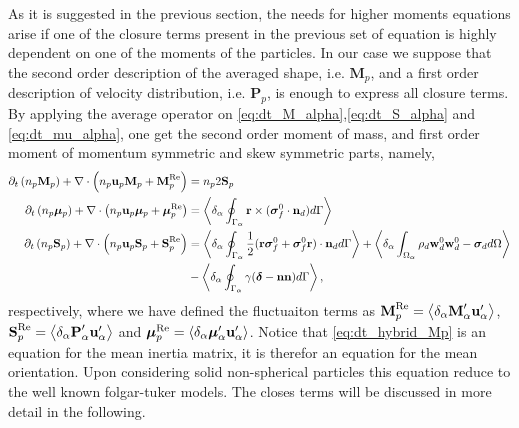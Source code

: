 As it is suggested in the previous section, the needs for higher moments equations arise if one of the closure terms present in the previous set of equation is highly dependent on one of the moments of the particles. 
In our case we suppose that the second order description of the averaged shape, i.e. $\textbf{M}_p$, and a first order description of velocity distribution, i.e. $\textbf{P}_p$,  is enough to express all closure terms. 
By applying the average operator on \ref{eq:dt_M_alpha},\ref{eq:dt_S_alpha} and \ref{eq:dt_mu_alpha}, one get the second order moment of mass, and first order moment of momentum symmetric and skew symmetric parts, namely, 
\begin{align}
    \partial_t \left(n_p \textbf{M}_p\right)
    + \mathbf{\nabla}\cdot \left(
        n_p \textbf{u}_p \textbf{M}_p
    + \textbf{M}_p^\text{Re}
    \right)
    &=
    n_p2  \textbf{S}_p
    \label{eq:dt_hybrid_Mp}\\
    \label{eq:dt_hybrid_mup}
    \partial_t \left(n_p \bm{\mu}_p\right)
    + \mathbf{\nabla}\cdot \left(
    n_p \textbf{u}_p \bm{\mu}_p
    + \bm{\mu}_p^\text{Re}
    \right)
    &=
    \left<\delta_\alpha \oint_{\Gamma_{\alpha}} \textbf{r}\times(\bm\sigma_f^0\cdot \textbf{n}_d) d\Gamma\right>
    \\
\label{eq:dt_hybrid_Sp}
\partial_t \left(n_p \textbf{S}_p\right)
+ \mathbf{\nabla}\cdot \left(
    n_p \textbf{u}_p \textbf{S}_p
+ \textbf{S}_p^\text{Re}
\right)
&=
\left<\delta_\alpha \oint_{\Gamma_{\alpha}} \frac{1}{2}(\textbf{r}\bm\sigma_f^0+\bm\sigma_f^0\textbf{r})\cdot \textbf{n}_d d\Gamma\right>
+ \left<\delta_\alpha \int_{\Omega_{\alpha}} 
    \rho_d \textbf{w}_d^0  \textbf{w}_d^0 
    - \bm{\sigma}_d
 d\Omega\right>\nonumber\\
&-  \left<\delta_\alpha \oint_{\Gamma_{\alpha}} \gamma (\bm\delta - \textbf{nn}) d\Gamma\right>,
\end{align}
respectively, where we have defined the fluctuaiton terms as $
 \textbf{M}_p^\text{Re}
 = \left<\delta_\alpha \textbf{M}_\alpha' \textbf{u}_\alpha'\right> $,  $ 
 \textbf{S}_p^\text{Re}
 = \left<\delta_\alpha \textbf{P}_\alpha' \textbf{u}_\alpha'\right>$ and $ 
 \bm{\mu}_p^\text{Re}
 = \left<\delta_\alpha \bm{\mu}_\alpha' \textbf{u}_\alpha'\right>
$.
Notice that \ref{eq:dt_hybrid_Mp}  is an equation for the mean inertia matrix, it is therefor an equation for the mean orientation. 
Upon considering solid non-spherical particles this equation reduce to the well known folgar-tuker models. 
The closes terms will be discussed in more detail in the following. 

